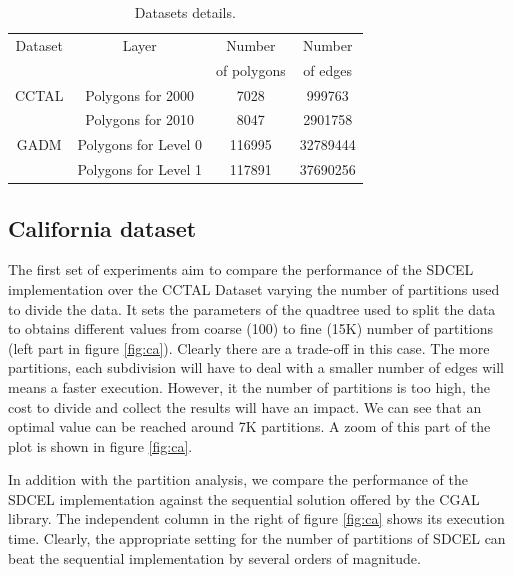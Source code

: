 \begin{table}[!ht]
    \caption{Datasets details.}
    \label{tab:datasets}
    \begin{tabular}{c c c c}
        \toprule
        Dataset & Layer & Number        & Number    \\
                &       & of polygons   & of edges  \\
        \midrule
        CCTAL & Polygons for 2000 & 7028 & 999763  \\
              & Polygons for 2010 & 8047 & 2901758 \\
        GADM  & Polygons for Level 0 & 116995 & 32789444 \\
              & Polygons for Level 1 & 117891 & 37690256 \\
        \bottomrule
    \end{tabular}
\end{table}

\subsection{California dataset}

The first set of experiments aim to compare the performance of the SDCEL implementation over the CCTAL Dataset varying the number of partitions used to divide the data. It sets the parameters of the quadtree used to split the data to obtains different values from coarse (100) to fine (15K) number of partitions (left part in figure \ref{fig:ca}).  Clearly there are a trade-off in this case.  The more partitions, each subdivision will have to deal with a smaller number of edges will means a faster execution.  However, it the number of partitions is too high, the cost to divide and collect the results will have an impact.  We can see that an optimal value can be reached around 7K partitions.  A zoom of this part of the plot is shown in figure \ref{fig:ca}.

In addition with the partition analysis, we compare the performance of the SDCEL implementation against the sequential solution offered by the CGAL library.  The independent column in the right of figure \ref{fig:ca} shows its execution time.  Clearly, the appropriate setting for the number of partitions of SDCEL can beat the sequential implementation by several orders of magnitude.

